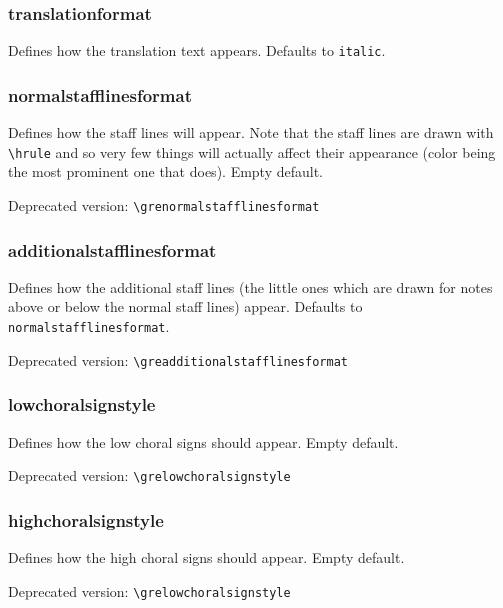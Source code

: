 \subsubsection*{translationformat}
Defines how the translation text appears.  Defaults to \verb=italic=.

\subsubsection*{normalstafflinesformat}
Defines how the staff lines will appear.  Note that the staff lines
are drawn with \verb=\hrule= and so very few things will actually
affect their appearance (color being the most prominent one that
does).  Empty default.

\smallskip\hskip 15pt Deprecated version: \verb=\grenormalstafflinesformat=

\subsubsection*{additionalstafflinesformat}
Defines how the additional staff lines (the little ones which are
drawn for notes above or below the normal staff lines) appear.
Defaults to \verb=normalstafflinesformat=.

\smallskip\hskip 15pt Deprecated version: \verb=\greadditionalstafflinesformat=

\subsubsection*{lowchoralsignstyle}
Defines how the low choral signs should appear.  Empty default.

\smallskip\hskip 15pt Deprecated version: \verb=\grelowchoralsignstyle=

\subsubsection*{highchoralsignstyle}
Defines how the high choral signs should appear.  Empty default.

\smallskip\hskip 15pt Deprecated version: \verb=\grelowchoralsignstyle=

